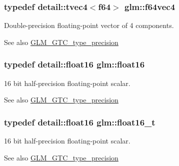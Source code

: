 \subsubsection[{f64vec4}]{\setlength{\rightskip}{0pt plus 5cm}typedef detail\+::tvec4$<$f64$>$ {\bf glm\+::f64vec4}}\label{group__gtc__type__precision_ga5032a5abd2c2a1f18927c9eeef088c7b}
Double-\/precision floating-\/point vector of 4 components. \begin{DoxySeeAlso}{See also}
\hyperlink{group__gtc__type__precision}{G\+L\+M\+\_\+\+G\+T\+C\+\_\+type\+\_\+precision} 
\end{DoxySeeAlso}
\hypertarget{group__gtc__type__precision_ga50c577688ec4cbdb3dfafb8e8155c82f}{}
\subsubsection[{float16}]{\setlength{\rightskip}{0pt plus 5cm}typedef detail\+::float16 {\bf glm\+::float16}}\label{group__gtc__type__precision_ga50c577688ec4cbdb3dfafb8e8155c82f}
16 bit half-\/precision floating-\/point scalar. \begin{DoxySeeAlso}{See also}
\hyperlink{group__gtc__type__precision}{G\+L\+M\+\_\+\+G\+T\+C\+\_\+type\+\_\+precision} 
\end{DoxySeeAlso}
\hypertarget{group__gtc__type__precision_ga7dd9d64b24117690e47631d07f08a207}{}
\subsubsection[{float16\+\_\+t}]{\setlength{\rightskip}{0pt plus 5cm}typedef detail\+::float16 {\bf glm\+::float16\+\_\+t}}\label{group__gtc__type__precision_ga7dd9d64b24117690e47631d07f08a207}
16 bit half-\/precision floating-\/point scalar. \begin{DoxySeeAlso}{See also}
\hyperlink{group__gtc__type__precision}{G\+L\+M\+\_\+\+G\+T\+C\+\_\+type\+\_\+precision} 
\end{DoxySeeAlso}
\hypertarget{group__gtc__type__precision_ga814f2f65354b6588b067cc5c67a6b340}{}
